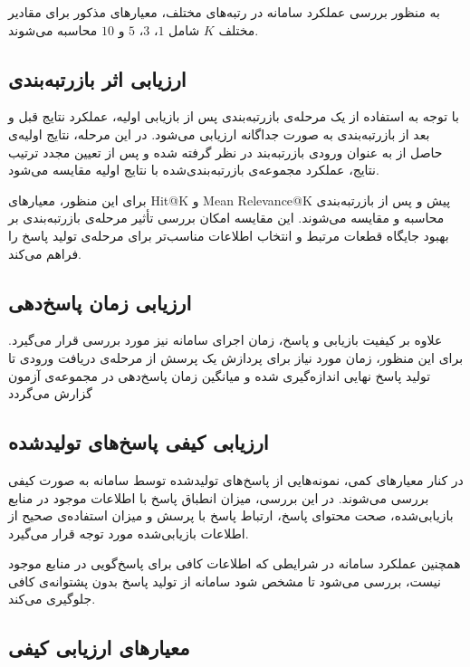 به منظور بررسی عملکرد سامانه در رتبه‌های مختلف، معیارهای مذکور
برای مقادیر مختلف $K$ شامل $1$، $3$، $5$ و $10$ محاسبه می‌شوند.


\subsection{ارزیابی اثر بازرتبه‌بندی}


با توجه به استفاده از یک مرحله‌ی بازرتبه‌بندی
 پس از بازیابی اولیه، عملکرد نتایج قبل و بعد
از بازرتبه‌بندی به صورت جداگانه ارزیابی می‌شود. در این مرحله،
نتایج اولیه‌ی حاصل از  به عنوان ورودی بازرتبه‌بند
در نظر گرفته شده و پس از تعیین مجدد ترتیب نتایج، عملکرد مجموعه‌ی
بازرتبه‌بندی‌شده با نتایج اولیه مقایسه می‌شود.

برای این منظور، معیارهای Hit@K و Mean Relevance@K پیش و پس از
بازرتبه‌بندی محاسبه و مقایسه می‌شوند. این مقایسه امکان بررسی تأثیر
مرحله‌ی بازرتبه‌بندی بر بهبود جایگاه قطعات مرتبط و انتخاب اطلاعات
مناسب‌تر برای مرحله‌ی تولید پاسخ را فراهم می‌کند.


\subsection{ارزیابی زمان پاسخ‌دهی}


علاوه بر کیفیت بازیابی و پاسخ، زمان اجرای سامانه نیز مورد بررسی
قرار می‌گیرد. برای این منظور، زمان مورد نیاز برای پردازش یک پرسش
از مرحله‌ی دریافت ورودی تا تولید پاسخ نهایی اندازه‌گیری شده و
میانگین زمان پاسخ‌دهی در مجموعه‌ی آزمون گزارش می‌گردد


\subsection{ارزیابی کیفی پاسخ‌های تولیدشده}


در کنار معیارهای کمی، نمونه‌هایی از پاسخ‌های تولیدشده توسط سامانه
به صورت کیفی بررسی می‌شوند. در این بررسی، میزان انطباق پاسخ با
اطلاعات موجود در منابع بازیابی‌شده، صحت محتوای پاسخ، ارتباط پاسخ
با پرسش و میزان استفاده‌ی صحیح از اطلاعات بازیابی‌شده مورد توجه
قرار می‌گیرد.

همچنین عملکرد سامانه در شرایطی که اطلاعات کافی برای پاسخ‌گویی در
منابع موجود نیست، بررسی می‌شود تا مشخص شود سامانه از تولید پاسخ
بدون پشتوانه‌ی کافی جلوگیری می‌کند.


\subsection{معیارهای ارزیابی کیفی}

